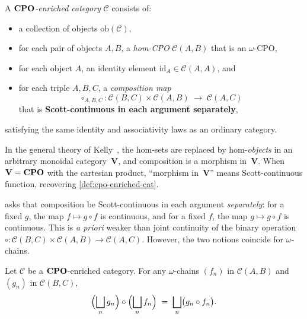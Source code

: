 \begin{definition}
\label{def:cpo-enriched-cat}
A \emph{$\mathbf{CPO}$-enriched category} $\mathcal{C}$ consists of:
\begin{itemize}
  \item a collection of objects $\mathrm{ob}(\mathcal{C})$,
  \item for each pair of objects $A, B$, a \emph{hom-CPO}
        $\mathcal{C}(A, B)$ that is an $\omega$-CPO,
  \item for each object $A$, an identity element
        $\mathrm{id}_A \in \mathcal{C}(A, A)$, and
  \item for each triple $A, B, C$, a \emph{composition map}
        \[
          \circ_{A,B,C} : \mathcal{C}(B, C) \times \mathcal{C}(A, B)
            \;\longrightarrow\; \mathcal{C}(A, C)
        \]
        that is \textbf{Scott-continuous in each argument separately},
\end{itemize}
satisfying the same identity and associativity laws as an ordinary
category.
\end{definition}

In the general theory of Kelly~\cite{Kelly1982}, the hom-sets are
replaced by hom-\emph{objects} in an arbitrary monoidal
category~$\mathbf{V}$, and composition is a morphism in~$\mathbf{V}$.
When $\mathbf{V} = \mathbf{CPO}$ with the cartesian product, ``morphism
in~$\mathbf{V}$'' means Scott-continuous function, recovering
\cref{def:cpo-enriched-cat}.

\begin{remark}
\label{rem:separate-vs-joint}
 asks that composition be Scott-continuous in
each argument \emph{separately}: for a fixed $g$, the map
$f \mapsto g \circ f$ is continuous, and for a fixed $f$, the map
$g \mapsto g \circ f$ is continuous. This is \emph{a priori} weaker than
joint continuity of the binary operation
$\circ : \mathcal{C}(B,C) \times \mathcal{C}(A,B) \to \mathcal{C}(A,C)$.
However, the two notions coincide for $\omega$-chains.
\end{remark}

\begin{proposition}
\label{prop:joint-continuity}
Let $\mathcal{C}$ be a $\mathbf{CPO}$-enriched category.  For any
$\omega$-chains $(f_n)$ in $\mathcal{C}(A, B)$ and $(g_n)$ in
$\mathcal{C}(B, C)$,
\begin{equation}
\label{eq:joint-continuity}
  \Bigl(\bigsqcup_n g_n\Bigr) \circ \Bigl(\bigsqcup_n f_n\Bigr)
    \;=\; \bigsqcup_n \bigl(g_n \circ f_n\bigr).
\end{equation}
\end{proposition}

